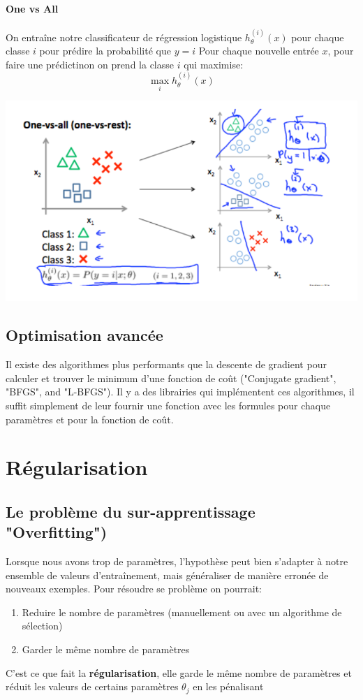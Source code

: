 \documentclass{article}
\theoremstyle{definition}
\begin{document}
\paragraph{One vs All}
On entraîne notre classificateur de régression logistique $h_\theta^{(i)}(x)$ pour chaque classe $i$ pour prédire la probabilité que $y=i$ \newline
Pour chaque nouvelle entrée $x$, pour faire une prédictinon on prend la classe $i$ qui maximise: 
\begin{equation*}
\max_i h_\theta^{(i)}(x)
\end{equation*}
\begin{center}
\includegraphics[scale=0.5]{onevsall}
\end{center}
\subsection{Optimisation avancée}
Il existe des algorithmes plus performants que la descente de gradient pour calculer et trouver le minimum d'une fonction de coût ("Conjugate gradient", "BFGS", and "L-BFGS"). \newline
Il y a des librairies qui implémentent ces algorithmes, il suffit simplement de leur fournir une fonction avec les formules pour chaque paramètres et pour la fonction de coût.\par
\newpage 
\section{Régularisation}
\subsection{Le problème du sur-apprentissage "Overfitting")}
Lorsque nous avons trop de paramètres, l'hypothèse peut bien s'adapter à notre ensemble de valeurs d'entraînement, mais généraliser de manière erronée de nouveaux exemples. \newline
Pour résoudre se problème on pourrait:
\begin{enumerate}

\item Reduire le nombre de paramètres (manuellement ou avec un algorithme de sélection)
\item Garder le même nombre de paramètres
\end{enumerate}
C'est ce que fait la \textbf{régularisation}, elle garde le même nombre de paramètres et réduit les valeurs de certains paramètres $\theta_j$ en les pénalisant \par
\end{document}
